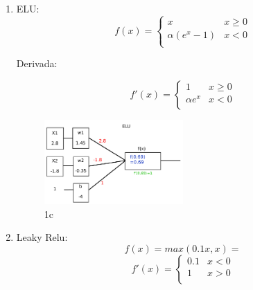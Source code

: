 \begin{enumerate}[label=(\alph*)]
    \item ELU:
    \[  f(x)=
        \begin{cases}
            x  & x \geq 0 \\
            \alpha(e^x - 1) & x < 0\\
        \end{cases}
        \]

    Derivada:

    \[ f'(x)=
        \begin{cases}
            1  & x \geq 0 \\
            \alpha e^x & x < 0\\
        \end{cases}
        \]

        \begin{figure}[H]
            \begin{small}
                \begin{center}
                    \includegraphics[width=0.5\textwidth]{Graphs/ejer1c.pdf}
                \end{center}
                \caption{1c}
                \label{fig:1c}
            \end{small}
        \end{figure}
        

    \item Leaky Relu:
    \[ f(x) = max(0.1x, x) =  \]
    \[ f'(x) =    \begin{cases}
                    0.1  & x < 0 \\
                    1    & x > 0\\
                 \end{cases}  \]


\end{enumerate}
